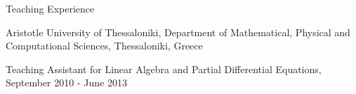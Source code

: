 \documentclass[10pt]{article} %
\newenvironment{outerlist}[1][\enskip\textbullet]%
        {\begin{itemize}[#1]}{\end{itemize}%
         \vspace{-.6\baselineskip}}
\newenvironment{innerlist}[1][\enskip\textbullet]%
        {\begin{compactitem}[#1]}{\end{compactitem}}
\begin{document}
\begin{section}{Teaching Experience}
\begin{outerlist}
\begin{innerlist}
%
\end{innerlist}
\item[$\bullet$] Aristotle University of Thessaloniki, Department of Mathematical, Physical and Computational
Sciences, Thessaloniki, Greece
\begin{innerlist}
\item[$\triangleright$] Teaching Assistant for Linear Algebra and Partial Differential Equations,
September 2010 - June 2013
\end{innerlist}

\end{outerlist}

\end{section}

\end{document}
